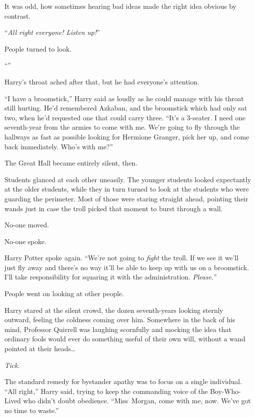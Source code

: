 It was odd, how sometimes hearing bad ideas made the right idea obvious by contrast.

“\emph{All right everyone! Listen up!}”

People turned to look.

“”

Harry’s throat ached after that, but he had everyone’s attention.

“I have a broomstick,” Harry said as loudly as he could manage with his throat still hurting. He’d remembered Azkaban, and the broomstick which had only sat two, when he’d requested one that could carry three. “It’s a 3-seater. I need one seventh-year from the armies to come with me. We’re going to fly through the hallways as fast as possible looking for Hermione Granger, pick her up, and come back immediately. Who’s with me?”

The Great Hall became entirely silent, then.

\later

Students glanced at each other uneasily. The younger students looked expectantly at the older students, while they in turn turned to look at the students who were guarding the perimeter. Most of those were staring straight ahead, pointing their wands just in case the troll picked that moment to burst through a wall.

No-one moved.

No-one spoke.

Harry Potter spoke again. “We’re not going to \emph{fight} the troll. If we see it we’ll just fly away and there’s no way it’ll be able to keep up with us on a broomstick. I’ll take responsibility for squaring it with the administration. \emph{Please.}”

People went on looking at other people.

\later

Harry stared at the silent crowd, the dozen seventh-years looking sternly outward, feeling the coldness coming over him. Somewhere in the back of his mind, Professor Quirrell was laughing scornfully and mocking the idea that ordinary fools would ever do something useful of their own will, without a wand pointed at their heads…

\emph{Tick.}

The standard remedy for bystander apathy was to focus on a single individual. “All right,” Harry said, trying to keep the commanding voice of the Boy-Who-Lived who didn’t doubt obedience. “Miss~Morgan, come with me, now. We’ve got no time to waste.”

